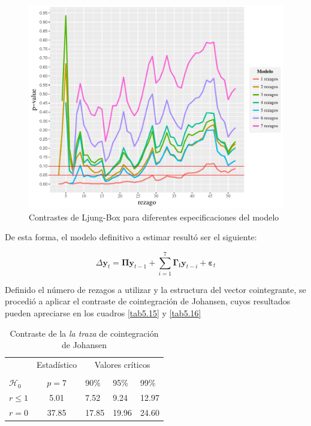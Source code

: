 \begin{figure}
\centering
\caption{Contrastes de Ljung-Box para diferentes especificaciones del modelo}
\includegraphics[scale=0.6]{fig_results/fig1.pdf}
\end{figure}


De esta forma, el modelo definitivo a estimar resultó ser el siguiente: 

\begin{equation}
\Delta \mathbf{y}_{t} = \boldsymbol{\Pi}\mathbf{y}_{t-1}+\sum_{i=1}^{7}\boldsymbol{\Gamma_{i}}\mathbf{y}_{t-i}+\boldsymbol{\varepsilon}_{t}
\end{equation}

Definido el número de rezagos a utilizar y la estructura del vector cointegrante, se procedió a aplicar el contraste de cointegración de Johansen, cuyos resultados pueden apreciarse en los cuadros \ref{tab5.15} y \ref{tab5.16}

\begin{table}[!htpb]
\caption{Contraste de la \textit{la traza} de cointegración de Johansen\label{tab5.15}}
\begin{center}
\begin{tabular}{@{}lrllll@{}}
\toprule
\multicolumn{1}{l}{} & \multicolumn{2}{c}{Estadístico} &
\multicolumn{3}{c}{Valores críticos} \\
\cmidrule(l){2-3} \cmidrule(l){4-6} \\
\multicolumn{1}{l}{$\mathcal{H}_0$} & \multicolumn{2}{c}{$p = 7$} &
\multicolumn{1}{l}{90\%}&
\multicolumn{1}{l}{95\%}&
\multicolumn{1}{l}{99\%}
\\
\midrule
$r \leq 1$  & \multicolumn{2}{c}{5.01}  & 7.52 & 9.24 & 12.97\\
$r = 0$     & \multicolumn{2}{c}{ 37.85}  & 17.85 & 19.96 & 24.60\\
\bottomrule
\end{tabular}
\end{center}
\label{tab-10}
\end{table}

